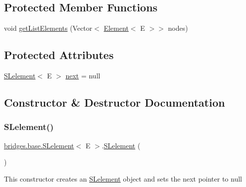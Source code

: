 \subsection*{Protected Member Functions}
\begin{DoxyCompactItemize}
\item 
void \hyperlink{classbridges_1_1base_1_1_s_lelement_abadffea339171349a8e86ded9cd3fe21}{get\+List\+Elements} (Vector$<$ \hyperlink{classbridges_1_1base_1_1_element}{Element}$<$ E $>$$>$ nodes)
\end{DoxyCompactItemize}
\subsection*{Protected Attributes}
\begin{DoxyCompactItemize}
\item 
\hyperlink{classbridges_1_1base_1_1_s_lelement}{S\+Lelement}$<$ E $>$ \hyperlink{classbridges_1_1base_1_1_s_lelement_abf61c96a74ad319d561c6952ea388e0e}{next} = null
\end{DoxyCompactItemize}


\subsection{Constructor \& Destructor Documentation}
\mbox{\label{classbridges_1_1base_1_1_s_lelement_ab9c8a08dadd76d7e0c29d7c41cf277c4}} 
\subsubsection{\texorpdfstring{S\+Lelement()}{SLelement()}\hspace{0.1cm}{\footnotesize\ttfamily [1/5]}}
{\footnotesize\ttfamily \hyperlink{classbridges_1_1base_1_1_s_lelement}{bridges.\+base.\+S\+Lelement}$<$ E $>$.\hyperlink{classbridges_1_1base_1_1_s_lelement}{S\+Lelement} (\begin{DoxyParamCaption}{ }\end{DoxyParamCaption})}

This constructor creates an \hyperlink{classbridges_1_1base_1_1_s_lelement}{S\+Lelement} object and sets the next pointer to null \mbox{\label{classbridges_1_1base_1_1_s_lelement_a8e32c9b9e8fc8f9f1eccb14b97e031e7}} 
